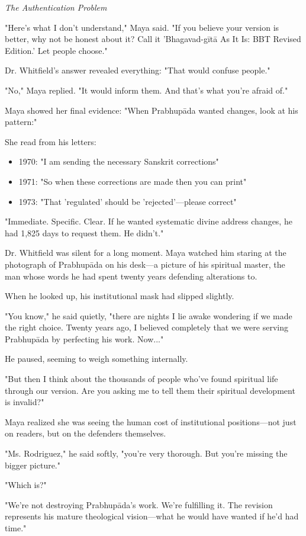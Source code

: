 \documentclass[12pt]{article}
\begin{document}
\textit{The Authentication Problem}

"Here's what I don't understand," Maya said. "If you believe your version is better, why not be honest about it? Call it 'Bhagavad-gītā As It Is: BBT Revised Edition.' Let people choose."

Dr. Whitfield's answer revealed everything: "That would confuse people."

"No," Maya replied. "It would inform them. And that's what you're afraid of."

Maya showed her final evidence: "When Prabhupāda wanted changes, look at his pattern:"

She read from his letters:
\begin{itemize}
\item 1970: "I am sending the necessary Sanskrit corrections"
\item 1971: "So when these corrections are made then you can print"
\item 1973: "That 'regulated' should be 'rejected'—please correct"
\end{itemize}

"Immediate. Specific. Clear. If he wanted systematic divine address changes, he had 1,825 days to request them. He didn't."

Dr. Whitfield was silent for a long moment. Maya watched him staring at the photograph of Prabhupāda on his desk—a picture of his spiritual master, the man whose words he had spent twenty years defending alterations to.

When he looked up, his institutional mask had slipped slightly.

"You know," he said quietly, "there are nights I lie awake wondering if we made the right choice. Twenty years ago, I believed completely that we were serving Prabhupāda by perfecting his work. Now..."

He paused, seeming to weigh something internally.

"But then I think about the thousands of people who've found spiritual life through our version. Are you asking me to tell them their spiritual development is invalid?"

Maya realized she was seeing the human cost of institutional positions—not just on readers, but on the defenders themselves.

"Ms. Rodriguez," he said softly, "you're very thorough. But you're missing the bigger picture."

"Which is?"

"We're not destroying Prabhupāda's work. We're fulfilling it. The revision represents his mature theological vision—what he would have wanted if he'd had time."
\end{document}
